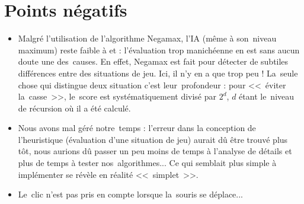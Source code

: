 \section{Points négatifs}
\begin{itemize}

	\item Malgré l'utilisation de l'algorithme Negamax, l'IA (même à son~niveau maximum) reste faible à \ttt{} et \cf{} : 
            l'évaluation trop manichéenne en est sans aucun doute une des~causes. En effet, Negamax est fait pour 
            détecter de subtiles différences entre des situations de jeu. Ici, il n'y en a que trop peu ! 
            La~seule chose qui distingue deux situation c'est leur~profondeur : pour <<~éviter la~casse~>>, 
            le~score est systématiquement divisé par $2^d$, $d$ étant le~niveau de récursion où il a été calculé. 
            
    \item Nous avons mal géré notre~temps : l'erreur dans la conception de l'heuristique (évaluation d'une situation de jeu) 
            aurait dû être trouvé plus tôt, nous aurions dû passer un peu moins de temps à l'analyse de détails 
            et plus de temps à tester nos~algorithmes... Ce qui semblait plus simple à implémenter 
            se révèle en réalité <<~simplet~>>.
            
    \item Le~clic n'est pas pris en compte lorsque la~souris se déplace...
    
\end{itemize}